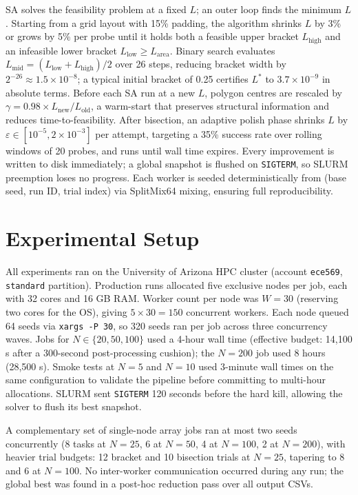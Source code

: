 \documentclass[10pt,twocolumn]{article}
\begin{document}
SA solves the feasibility problem at a fixed $L$; an outer loop finds
the minimum $L$. Starting from a grid layout with 15\% padding, the
algorithm shrinks $L$ by 3\% or grows by 5\% per probe until it holds
both a feasible upper bracket $L_{\mathrm{high}}$ and an infeasible
lower bracket $L_{\mathrm{low}} \geq L_{\mathrm{area}}$. Binary
search evaluates $L_{\mathrm{mid}} = (L_{\mathrm{low}} +
L_{\mathrm{high}})/2$ over 26 steps, reducing bracket width by
$2^{-26} \approx 1.5 \times 10^{-8}$; a typical initial bracket of
0.25 certifies $L^*$ to $3.7 \times 10^{-9}$ in absolute terms.
Before each SA run at a new $L$, polygon centres are rescaled by
$\gamma = 0.98 \times L_{\mathrm{new}} / L_{\mathrm{old}}$, a
warm-start that preserves structural information and reduces
time-to-feasibility. After bisection, an adaptive polish phase shrinks
$L$ by $\varepsilon \in [10^{-5}, 2\times 10^{-3}]$ per attempt,
targeting a 35\% success rate over rolling windows of 20 probes, and
runs until wall time expires. Every improvement is written to disk
immediately; a global snapshot is flushed on \texttt{SIGTERM}, so
SLURM preemption loses no progress. Each worker is seeded
deterministically from (base seed, run ID, trial index) via SplitMix64
mixing, ensuring full reproducibility.

\section{Experimental Setup}
\label{sec:experiments}

All experiments ran on the University of Arizona HPC cluster (account
\texttt{ece569}, \texttt{standard} partition). Production runs
allocated five exclusive nodes per job, each with 32 cores and 16 GB
RAM. Worker count per node was $W = 30$ (reserving two cores for the
OS), giving $5 \times 30 = 150$ concurrent workers. Each node queued
64 seeds via \texttt{xargs -P~30}, so 320 seeds ran per job across
three concurrency waves. Jobs for $N \in \{20, 50, 100\}$ used a
4-hour wall time (effective budget: 14{,}100 s after a 300-second
post-processing cushion); the $N = 200$ job used 8 hours (28{,}500 s).
Smoke tests at $N = 5$ and $N = 10$ used 3-minute wall times on the
same configuration to validate the pipeline before committing to
multi-hour allocations. SLURM sent \texttt{SIGTERM} 120 seconds before
the hard kill, allowing the solver to flush its best snapshot.

A complementary set of single-node array jobs ran at most two seeds
concurrently (8 tasks at $N=25$, 6 at $N=50$, 4 at $N=100$, 2 at
$N=200$), with heavier trial budgets: 12 bracket and 10 bisection
trials at $N=25$, tapering to 8 and 6 at $N=100$. No inter-worker
communication occurred during any run; the global best was found in a
post-hoc reduction pass over all output CSVs.
\end{document}
